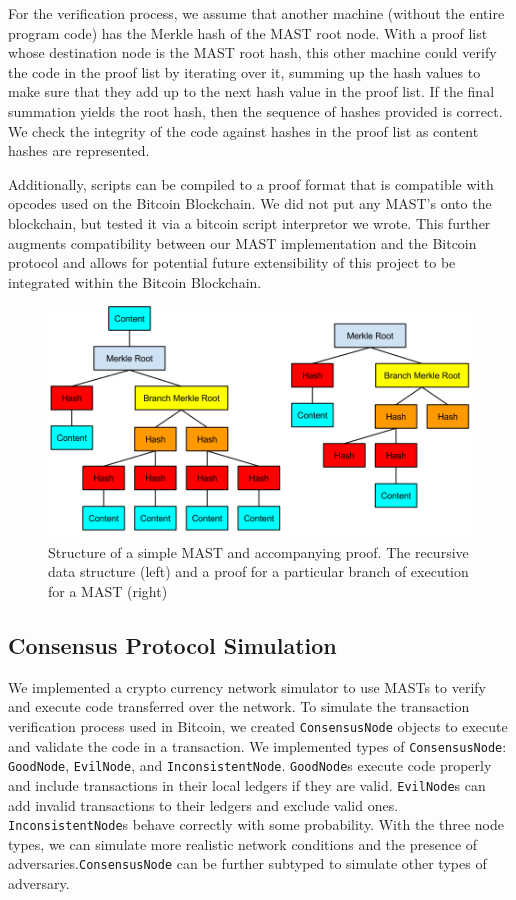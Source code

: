 \documentclass{vldb}
\begin{document}
For the verification process, we assume that another machine (without the
entire program code) has the Merkle hash of the MAST root node. With a proof
list whose destination node is the MAST root hash, this other machine could
verify the code in the proof list by iterating over it, summing up the hash
values to make sure that they add up to the next hash value in the proof list.
If the final summation yields the root hash, then the sequence of hashes
provided is correct. We check the integrity of the code against hashes in the
proof list as content hashes are represented.

Additionally, scripts can be compiled to a proof format that is compatible with
opcodes used on the Bitcoin Blockchain. We did not put any MAST's onto the blockchain, but tested it
via a bitcoin script interpretor we wrote. This further augments compatibility between our
MAST implementation and the Bitcoin protocol and allows for potential future
extensibility of this project to be integrated within the Bitcoin Blockchain.

\begin{figure}[h]
	\includegraphics[scale=.35]{mast}
	\caption{Structure of a simple MAST and accompanying proof. The recursive data structure (left) and a proof for a particular branch of execution for a MAST (right)}
	\label{system}
\end{figure}

\subsection{Consensus Protocol Simulation}

We implemented a crypto currency network simulator to use MASTs to verify and
execute code transferred over the network. To simulate the transaction
verification process used in Bitcoin, we created \texttt{ConsensusNode} objects to
execute and validate the code in a transaction. We implemented types
of \texttt{ConsensusNode}: \texttt{GoodNode}, \texttt{EvilNode}, and
\texttt{InconsistentNode}. \texttt{GoodNode}s execute code properly and
include transactions in their local ledgers if they are valid.
\texttt{EvilNode}s can add invalid transactions to their
ledgers and exclude valid ones. \texttt{InconsistentNode}s behave correctly with some
probability. With the three node types, we can simulate more realistic network
conditions and the presence of adversaries.\texttt{ConsensusNode} can be further
subtyped to simulate other types of adversary.
\end{document}
